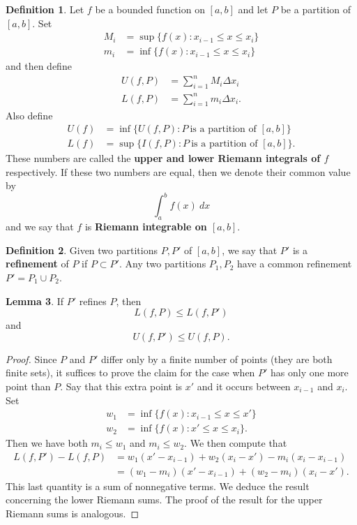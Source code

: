 \documentclass[12pt]{article}
\theoremstyle{definition}
\newtheorem{definition}{Definition}
\theoremstyle{theorem}
\newtheorem{lemma}[definition]{Lemma}
\begin{document}
\begin{definition}
Let $f$ be a bounded function on $[a,b]$ and let $P$ be a partition of $[a,b]$. Set 
\begin{align*}
M_i &= \sup \{f(x) : x_{i-1} \leqslant x \leqslant x_{i}\} \\
m_i &= \inf\{f(x) : x_{i-1} \leqslant x \leqslant x_{i}\}
\end{align*}
and then define 
\begin{align*}
U(f,P) &= \sum_{i=1}^n M_i \Delta x_i \\
L(f,P) &= \sum_{i=1}^n m_i \Delta x_i.
\end{align*}
Also define 
\begin{align*}
U(f) &= \inf\{U(f,P) : P \: \text{is a partition of $[a,b]$}\} \\
L(f) &= \sup\{I(f,P) : P \: \text{is a partition of $[a,b]$}\}.
\end{align*}
These numbers are called the \textbf{upper and lower Riemann integrals of $f$} respectively. If these two numbers are equal, then we denote their common value by 
\[
\int_a^b f(x) \: dx
\]
and we say that $f$ is \textbf{Riemann integrable on $[a,b]$}. 
\end{definition}

\begin{definition}
Given two partitions $P, P'$ of $[a,b]$, we say that $P'$ is a \textbf{refinement} of $P$ if $P \subset P'$. Any two partitions $P_1, P_2$ have a common refinement $P' = P_1 \cup P_2$. 
\end{definition}

\begin{lemma}
If $P'$ refines $P$, then 
\[
L(f,P) \leqslant L(f,P')
\]
and 
\[
U(f,P') \leqslant U(f,P).
\]
\end{lemma}

\begin{proof}
Since $P$ and $P'$ differ only by a finite number of points (they are both finite sets), it suffices to prove the claim for the case when $P'$ has only one more point than $P$. Say that this extra point is $x'$ and it occurs between $x_{i-1}$ and $x_i$. Set 
\begin{align*}
w_1 &= \inf \{f(x) : x_{i-1} \leqslant x \leqslant x'\} \\
w_2 &= \inf \{f(x) : x' \leqslant x \leqslant x_i\}.
\end{align*}
Then we have both $m_i \leqslant w_1$ and $m_i \leqslant w_2$. We then compute that 
\begin{align*}
L(f,P') - L(f,P) &= w_1(x' - x_{i-1}) + w_2(x_i - x') - m_i(x_i - x_{i-1}) \\
&= (w_1 - m_i)(x' - x_{i-1}) + (w_2 - m_i)(x_i - x').
\end{align*}
This last quantity is a sum of nonnegative terms. We deduce the result concerning the lower Riemann sums. The proof of the result for the upper Riemann sums is analogous. 
\end{proof}
\end{document}
